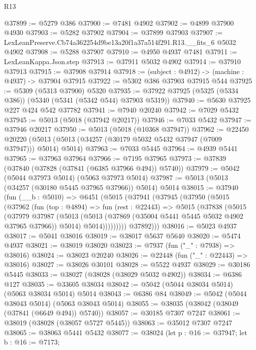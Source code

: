 \begin{lexlean}{R13}
\begin{coremodule}
@37899 := @5279 @386
@37900 := @7481 @4902
@37902 := @4899 @37900 @4930
@37903 := @5282 @37902
@37904 := @37899 @37903
@37907 := LexLeanPreserve.Cb74a362254d9be13a20f1a37a514f291.R13.__fits_6 @5032 @4902
@37908 := @5288 @37907
@37910 := @4950 @4937 @7481
@37911 := LexLeanKappa.Json.step
@37913 := @37911 @5032 @4902
@37914 := @37910 @37913
@37915 := @37908 @37914
@37918 := (subject : @4912) -> (machine : @4937) -> @37904 @37915
@37922 := @5302 @386 @37903 @37915 @544
@37925 := @5309 (@5313 @37900) @5320
@37935 := @37922 @37925 (@5325 (@5334 @386)) (@5340 (@5341 (@5342 @544) @37903 @5319))
@37940 := @5630 @37925 @227 @424 @542 @37782
@37941 := @7940 @20240
@37942 := @7029 @5432
@37945 := @5013 (@5018 (@37942 @20217))
@37946 := @7033 @5432
@37947 := @37946 @20217
@37950 := @5013 (@5018 (@10368 @37947))
@37962 := @22450
    @20220
    (@5013 (@5013 (@34257 (@30179 @5032 @5432 @37947 (@7009 @37947))) @5014) @5014)
@37963 := @7033 @5445
@37964 := @4939 @5441
@37965 := @37963 @37964
@37966 := @7195 @37965
@37973 := @37839 (@37840 (@37828 (@37841 (@6385 @37966 @494)) @5740))
@37979 := @5042 (@5044 @37973 @5014) (@5063 @37973 @5014)
@37987 := @5013 (@5013 (@34257 (@30180 @5445 @37965 @37966)) @5014) @5014
@38015 := @37940
    (fun (__b : @5010) =>
    @6451
      (@5015
        (@37941
          (@37945
            (@37950
              (@5015
                (@37962
                  (fun (top : @4894) =>
                  fun (rest : @22443) =>
                  @5015
                    (@37838
                      (@5015
                        (@37979
                          @37987
                          (@5013
                            (@5013 (@37869 (@35004 @5441 @5445 @5032 @4902 @37965 @37966)) @5014)
                            @5014)))))))))
          @37892)))
@38016 := @5023 @4937
@38017 := @5041 @38016
@38019 := @38017 @5637 @5640
@38020 := @5474 @4937
@38021 := @38019 @38020
@38023 := @7937 (fun ("_" : @7938) => @38016)
@38024 := @38023 @20240
@38026 := @22448 (fun ("_" : @22443) => @38016)
@38027 := @38026 @30101
@38028 := @5522 @4937
@38029 := @30186 @5445
@38033 := @38027 (@38028 (@38029 @5032 @4902))
@38034 := @6386 @127
@38035 := @33605 @38034
@38042 := @5042 (@5044 @38034 @5014) (@5063 @38034 @5014) @5014
@38043 := @6386 @84
@38049 := @5042 (@5044 @38043 @5014) (@5063 @38043 @5014)
@38055 := @38035 (@38042 (@38049 (@37841 (@6649 @494)) @5740))
@38057 := @30185 @7307 @7247
@38061 := @38019 (@38028 (@38057 @5727 @5445))
@38063 := @35012 @7307 @7247
@38065 := @38063 @5441 @5432
@38077 := @38024
    (let p : @16 := @37947;
    let b : @16 := @7173;

\end{coremodule}
\end{lexlean}
